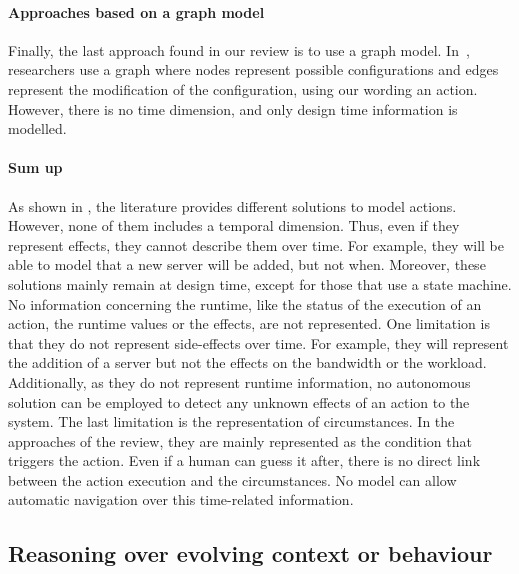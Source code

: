 \paragraph{Approaches based on a graph model}
Finally, the last approach found in our review is to use a graph model.
In~\cite{DBLP:journals/computer/GeorgasHT09}, researchers use a graph where nodes represent possible configurations and edges represent the modification of the configuration, using our wording an \gls{action}.
However, there is no time dimension, and only design time information is modelled.

\paragraph{Sum up}
As shown in , the literature provides different solutions to model \glspl{action}.
However, none of them includes a temporal dimension.
Thus, even if they represent effects, they cannot describe them over time.
For example, they will be able to model that a new server will be added, but not when.
Moreover, these solutions mainly remain at design time, except for those that use a state machine.
No information concerning the runtime, like the status of the execution of an action, the runtime values or the effects, are not represented.
One limitation is that they do not represent side-effects over time.
For example, they will represent the addition of a server but not the effects on the bandwidth or the workload.
Additionally, as they do not represent runtime information, no autonomous solution can be employed to detect any unknown effects of an action to the system.
The last limitation is the representation of \glspl{circumstance}.
In the approaches of the review, they are mainly represented as the condition that triggers the action.
Even if a human can guess it after, there is no direct link between the action execution and the circumstances.
No model can allow automatic navigation over this time-related information. 

\subsection[Reasoning over evolving context or behaviour]{Reasoning over evolving context or \gls{behaviour}}

